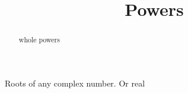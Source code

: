 \documentclass{ximera}
\title{Powers}
\begin{document}
\begin{abstract}
whole powers
\end{abstract}
\maketitle





Roots of any complex number.  Or real
\end{document}
